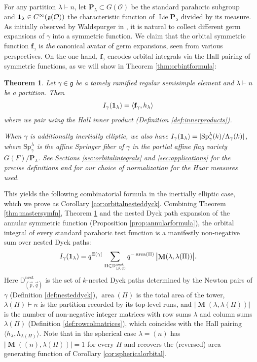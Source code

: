 \documentclass{amsart}
\numberwithin{equation}{section}
\newtheorem{theorem}[lemma]{Theorem}%
\theoremstyle{definition}
\def\16{{\bf 16}}
\def\1{{\bf 1}}
\def\Sp{{\mathrm{Sp}}}
\DeclareMathOperator{\Lie}{Lie}
\DeclareMathOperator{\MM}{\mathbf{M}}
\newcommand{\fgamma}{\mathbf{f}_{\gamma}}
\newcommand{\cO}{\mathcal{O}}
\newcommand{\fg}{\mathfrak{g}}
\newcommand{\bP}{\mathbf{P}}
\newcommand{\nDyck}{\mathbb{D}^{\mathrm{nest}}}
\DeclareMathOperator{\area}{\mathrm{area}}
\begin{document}
For any partition $\lambda\vdash n$, let $\bP_{\lambda}\subset G(\cO)$ be the standard parahoric subgroup and $\1_\lambda\in C^{\infty}(\fg(\cO))$ the characteristic function of $\Lie\bP_{\lambda}$ divided by its measure.
As initially observed by Waldspurger in \cite{W1,W2}, it is natural to collect different germ expansions of $\gamma$ into a symmetric function. We claim that the orbital symmetric function $\fgamma$ is {\em the} canonical avatar of germ expansions, seen from various perspectives. On the one hand, $\fgamma$ encodes orbital integrals via the Hall pairing of symmetric functions, as we will show in Theorem \ref{thm:orbintformula}:

\begin{theorem}
\label{thm:weightpolynomials}
Let $\gamma\in \fg$ be a tamely ramified regular semisimple element and $\lambda\vdash n$ be a partition. 
Then 
$$ I_\gamma(\1_\lambda)=\langle \fgamma, h_\lambda\rangle$$ where we pair using the Hall inner product (Definition \ref{def:innerproducts}). 

When $\gamma$ is additionally inertially elliptic, we also have $I_{\gamma}(\1_\lambda)=|\Sp_\gamma^\lambda(k)/\Lambda_\gamma(k)|$,  where $\Sp_\gamma^\lambda$ is the affine Springer fiber of $\gamma$ in the partial affine flag variety $G(F)/\bP_\lambda$. See Sections \ref{sec:orbitalintegrals} and \ref{sec:applications} for the precise definitions and for our choice of normalization for the Haar measures used.
\end{theorem}
This yields the following combinatorial formula in the inertially elliptic case, which we prove as Corollary \ref{cor:orbitalnesteddyck}. Combining Theorem \ref{thm:mastersymfn}, Theorem \ref{thm:weightpolynomials} and the nested Dyck path expansion of the annular symmetric function (Proposition \ref{prop:annularformula}), the orbital integral of every standard parahoric test function is a manifestly non-negative sum over nested Dyck paths:
\begin{equation}
\label{eq:orbitalnesteddyckintro}
I_\gamma(\1_\lambda)=q^{\Xi(\gamma)}\sum_{\Pi\in\nDyck_{(\vec p,\vec q)}}q^{-\area(\Pi)}\,\bigl|\MM(\lambda,\lambda(\Pi))\bigr|.
\end{equation}
Here $\nDyck_{(\vec p,\vec q)}$ is the set of $k$-nested Dyck paths determined by the Newton pairs of $\gamma$ (Definition \ref{def:nesteddyck}), $\area(\Pi)$ is the total area of the tower, $\lambda(\Pi)\vdash n$ is the partition recorded by its top-level runs, and $|\MM(\lambda,\lambda(\Pi))|$ is the number of non-negative integer matrices with row sums $\lambda$ and column sums $\lambda(\Pi)$ (Definition \ref{def:rowcolmatrices}), which coincides with the Hall pairing $\langle h_\lambda,h_{\lambda(\Pi)}\rangle$. Note that in the spherical case $\lambda=(n)$ has $|\MM((n),\lambda(\Pi))|=1$ for every $\Pi$ and recovers the (reversed) area generating function of Corollary \ref{cor:sphericalorbital}.%
\end{document}
